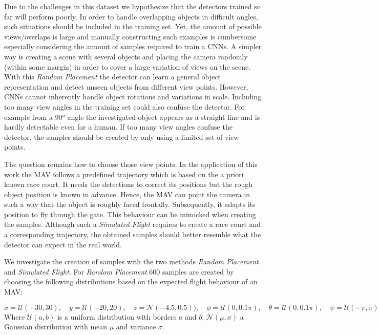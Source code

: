 Due to the challenges in this dataset we hypothesize that the detectors trained so far will perform poorly. In order to handle overlapping objects in difficult angles, such situations should be included in the training set. Yet, the amount of possible views/overlaps is large and manually constructing such examples is cumbersome especially considering the amount of samples required to train a \acp{CNN}. A simpler way is creating a scene with several objects and placing the camera randomly (within some margin) in order to cover a large variation of views on the scene. With this \textit{Random Placement} the detector can learn a general object representation and detect unseen objects from different view points. However, \acp{CNN} cannot inherently handle object rotations and variations in scale. Including too many view angles in the training set could also confuse the detector. For example from a 90° angle the investigated object appears as a straight line and is hardly detectable even for a human. If too many view angles confuse the detector, the samples should be created by only using a limited set of view points.

The question remains how to choose those view points. In the application of this work the \ac{MAV} follows a predefined trajectory which is based on the a priori known race court. It needs the detections to correct its positions but the rough object position is known in advance.
Hence, the \ac{MAV} can point the camera in such a way that the object is roughly faced frontally. Subsequently, it adapts its position to fly through the gate. This behaviour can be mimicked when creating the samples. Although such a \textit{Simulated Flight} requires to create a race court and a corresponding trajectory, the obtained samples should better resemble what the detector can expect in the real world.

We investigate the creation of samples with the two methods \textit{Random Placement} and \textit{Simulated Flight}. For \textit{Random Placement} 600 samples are created by choosing the following distributions based on the expected flight behaviour of an \ac{MAV}:

\begin{equation}
x = \mathcal{U}(-30,30),\quad y = \mathcal{U}(-20,20),\quad z = \mathcal{N}(-4.5,0.5)),\quad
\phi = \mathcal{U}(0,0.1\pi),\quad \theta = \mathcal{U}(0,0.1\pi),\quad \psi = \mathcal{U}(-\pi,\pi)
\label{eq:distroexp}
\end{equation}
Where $\mathcal{U}(a,b)$ is a uniform distribution with borders $a$ and $b$; $\mathcal{N}(\mu,\sigma)$ a Gaussian distribution with mean $\mu$ and variance $\sigma$. 

